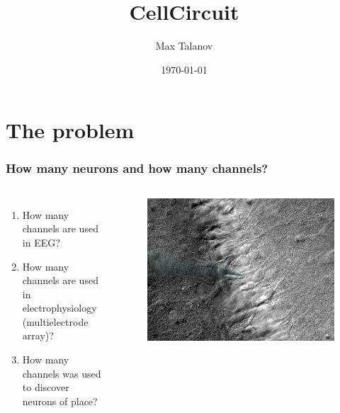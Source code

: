 \documentclass[12pt]{beamer}
\title[CellCircuit]{CellCircuit} %
\author{Max Talanov} %
\institute[IR ITIS KFU] %
{
IR ITIS KFU \\ %
\medskip
\textit{max.talanov@gmail.com} %
}
\date{\today} %
\begin{document}
\begin{frame}
\titlepage %
\end{frame}



\section{The problem} %

\begin{frame}
\frametitle{How many neurons and how many channels?}
\begin{columns}[c] %

\begin{enumerate}
\item How many channels are used in EEG?
\item How many channels are used in electrophysiology (multielectrode array)?
\item How many channels was used to discover neurons of place?
\end{enumerate}

\begin{figure}
\includegraphics[width=1.0\linewidth]{WholeCellPatchClamp-03}
\end{figure}
\end{columns}
\end{frame}
\end{document}
